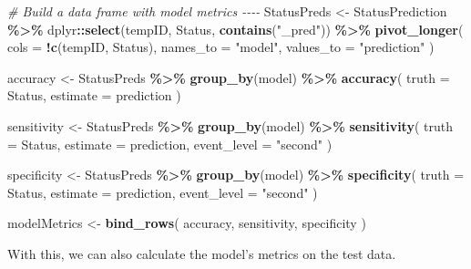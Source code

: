 \documentclass[
]{article}
\newenvironment{Shaded}{\begin{snugshade}}{\end{snugshade}}
\newcommand{\AttributeTok}[1]{\textcolor[rgb]{0.13,0.29,0.53}{#1}}
\newcommand{\CommentTok}[1]{\textcolor[rgb]{0.56,0.35,0.01}{\textit{#1}}}
\newcommand{\FunctionTok}[1]{\textcolor[rgb]{0.13,0.29,0.53}{\textbf{#1}}}
\newcommand{\NormalTok}[1]{#1}
\newcommand{\OtherTok}[1]{\textcolor[rgb]{0.56,0.35,0.01}{#1}}
\newcommand{\SpecialCharTok}[1]{\textcolor[rgb]{0.81,0.36,0.00}{\textbf{#1}}}
\newcommand{\StringTok}[1]{\textcolor[rgb]{0.31,0.60,0.02}{#1}}
\begin{document}
\begin{Shaded}
\begin{Highlighting}[]
\CommentTok{\# Build a data frame with model metrics {-}{-}{-}{-}}
\NormalTok{StatusPreds }\OtherTok{\textless{}{-}}\NormalTok{ StatusPrediction }\SpecialCharTok{\%\textgreater{}\%}
\NormalTok{  dplyr}\SpecialCharTok{::}\FunctionTok{select}\NormalTok{(tempID, Status, }\FunctionTok{contains}\NormalTok{(}\StringTok{"\_pred"}\NormalTok{)) }\SpecialCharTok{\%\textgreater{}\%}
  \FunctionTok{pivot\_longer}\NormalTok{(}
    \AttributeTok{cols =} \SpecialCharTok{!}\FunctionTok{c}\NormalTok{(tempID, Status),}
    \AttributeTok{names\_to =} \StringTok{"model"}\NormalTok{,}
    \AttributeTok{values\_to =} \StringTok{"prediction"}
\NormalTok{  )}

\NormalTok{accuracy }\OtherTok{\textless{}{-}}\NormalTok{ StatusPreds }\SpecialCharTok{\%\textgreater{}\%}
  \FunctionTok{group\_by}\NormalTok{(model) }\SpecialCharTok{\%\textgreater{}\%}
  \FunctionTok{accuracy}\NormalTok{(}
    \AttributeTok{truth =}\NormalTok{ Status,}
    \AttributeTok{estimate =}\NormalTok{ prediction}
\NormalTok{  )}

\NormalTok{sensitivity }\OtherTok{\textless{}{-}}\NormalTok{ StatusPreds }\SpecialCharTok{\%\textgreater{}\%}
  \FunctionTok{group\_by}\NormalTok{(model) }\SpecialCharTok{\%\textgreater{}\%}
  \FunctionTok{sensitivity}\NormalTok{(}
    \AttributeTok{truth =}\NormalTok{ Status,}
    \AttributeTok{estimate =}\NormalTok{ prediction,}
    \AttributeTok{event\_level =} \StringTok{"second"}
\NormalTok{  )}

\NormalTok{specificity }\OtherTok{\textless{}{-}}\NormalTok{ StatusPreds }\SpecialCharTok{\%\textgreater{}\%}
  \FunctionTok{group\_by}\NormalTok{(model) }\SpecialCharTok{\%\textgreater{}\%}
  \FunctionTok{specificity}\NormalTok{(}
    \AttributeTok{truth =}\NormalTok{ Status,}
    \AttributeTok{estimate =}\NormalTok{ prediction,}
    \AttributeTok{event\_level =} \StringTok{"second"}
\NormalTok{  )}

\NormalTok{modelMetrics }\OtherTok{\textless{}{-}} \FunctionTok{bind\_rows}\NormalTok{(}
\NormalTok{  accuracy,}
\NormalTok{  sensitivity,}
\NormalTok{  specificity}
\NormalTok{)}
\end{Highlighting}
\end{Shaded}

With this, we can also calculate the model's metrics on the test data.
\end{document}
